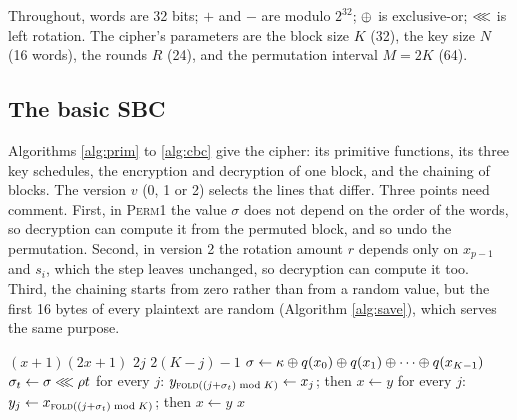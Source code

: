 Throughout, words are 32 bits; $+$ and $-$ are modulo $2^{32}$; $\oplus$ is
exclusive-or; $\lll$ is left rotation. The cipher's parameters are the block
size $K$ (32), the key size $N$ (16 words), the rounds $R$ (24), and the
permutation interval $M = 2K$ (64).

\subsection{The basic SBC}

Algorithms \ref{alg:prim} to \ref{alg:cbc} give the cipher: its primitive
functions, its three key schedules, the encryption and decryption of one block,
and the chaining of blocks. The version $v$ (0, 1 or 2) selects the lines that
differ. Three points need comment. First, in \textsc{Perm1} the value $\sigma$
does not depend on the order of the words, so decryption can compute it from the
permuted block, and so undo the permutation. Second, in version 2 the rotation
amount $r$ depends only on $x_{p-1}$ and $s_i$, which the step leaves unchanged,
so decryption can compute it too. Third, the chaining starts from zero rather
than from a random value, but the first 16 bytes of every plaintext are random
(Algorithm \ref{alg:save}), which serves the same purpose.

\begin{algorithm}[htbp]
\caption{The primitive functions}
\label{alg:prim}
\begin{algorithmic}[1]
  \State \Return $(x+1)(2x+1)$ 
\EndFunction
{} 
    \State \Return $2j$
  \Else
    \State \Return $2(K-j)-1$
  \EndIf
\EndFunction
{}
  \State $\sigma \gets \kappa \oplus q(x_0) \oplus q(x_1) \oplus \cdots \oplus q(x_{K-1})$
    \State $\sigma_t \gets \sigma \lll \rho t$
  \EndFor
      \State for every $j$: $y_{\textsc{fold}((j + \sigma_t) \bmod K)} \gets x_j$;
             then $x \gets y$
    \EndFor
  \Else {}
      \State for every $j$: $y_j \gets x_{\textsc{fold}((j + \sigma_t) \bmod K)}$;
             then $x \gets y$
    \EndFor
  \EndIf
  \State \Return $x$
\EndFunction
\end{algorithmic}
\end{algorithm}

